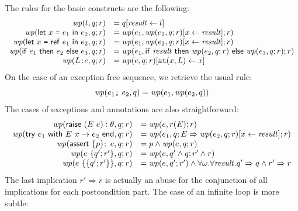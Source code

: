 \documentclass[a4paper,12pt]{report}
\begin{document}
The rules for the basic constructs are the following:
\begin{displaymath}
  \begin{array}{rl}
    \mathit{wp}(t,q;r) & = 
       q[\mathit{result} \leftarrow t] \\
    \mathit{wp}(\mathsf{let}~x~\texttt{=}~e_1~\mathsf{in}~e_2,q;r) & =
       \mathit{wp}(e_1,\mathit{wp}(e_2,q;r)[x\leftarrow\mathit{result}];r) \\
    \mathit{wp}(\mathsf{let}~x~\texttt{=}~\mathsf{ref}~e_1~\mathsf{in}~e_2,q;r) & =
       \mathit{wp}(e_1,\mathit{wp}(e_2,q;r)[x\leftarrow\mathit{result}];r) \\
    \mathit{wp}(\mathsf{if}~e_1~\mathsf{then}~e_2~\mathsf{else}~e_3,q;r) & =
       \mathit{wp}(e_1,\mathsf{if}~\mathit{result}~\mathsf{then}~\mathit{wp}(e_2,q;r)~\mathsf{else}~\mathit{wp}(e_3,q;r);r) \\
    \mathit{wp}(L\texttt{:}e,q;r) & =
       \mathit{wp}(e,q;r)[\mathtt{at}(x,L)\leftarrow x] \\
  \end{array}
\end{displaymath}
On the case of an exception free sequence, we retrieve the usual rule:
\begin{displaymath}
  \mathit{wp}(e_1\texttt{;}~e_2,q) = \mathit{wp}(e_1,\mathit{wp}(e_2,q))
\end{displaymath}
The cases of exceptions and annotations are also straightforward:
\begin{displaymath}
  \begin{array}{rl}
    \mathit{wp}(\mathsf{raise}~({E}~{e}):\theta,q;r) & = 
       \mathit{wp}(e,r(E);r) \\
    \mathit{wp}(\mathsf{try}~e_1~\mathsf{with}~E~x\rightarrow e_2~\mathsf{end},q;r) & = 
       \mathit{wp}(e_1,q;E\Rightarrow\mathit{wp}(e_2,q;r)[x\leftarrow\mathit{result}];r) \\
    \mathit{wp}(\mathsf{assert}~\{p\};~e,q;r) & =
       p \land \mathit{wp}(e,q;r) \\ 
    \mathit{wp}(e~\{q';r'\},q;r) & =
       \mathit{wp}(e,q' \land q;r'\land r) \\ 
    \mathit{wp}(e~\{\{q';r'\}\},q;r) & =
       \mathit{wp}(e,q';r') \land
       \forall\omega.\forall\mathit{result}.q'\Rightarrow q\land r'\Rightarrow r \\ 
  \end{array}
\end{displaymath}
The last implication $r'\Rightarrow r$ is actually an abuse for the 
conjunction of all implications for each postcondition part.
The case of an infinite loop is more subtle:
\end{document}
